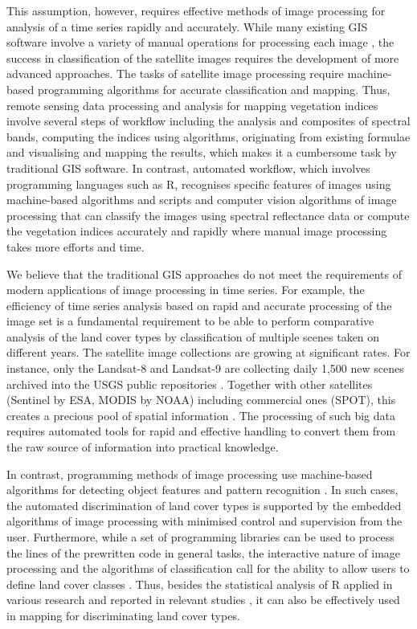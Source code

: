 \documentclass[12pt,a4paper,oneside]{article}
\def \newpar{\vspace{6pt}}
\begin{document}
\newpar This assumption, however, requires effective methods of image processing for analysis of a time series rapidly and accurately. While many existing GIS software involve a variety of manual operations for processing each image \citep{TAPPAN200738,SPIEKERMANN2015113,EPUH2022100067}, the success in classification of the satellite images requires the development of more advanced approaches. The tasks of satellite image processing require machine-based programming algorithms for accurate classification and mapping. Thus, remote sensing data processing and analysis for mapping vegetation indices involve several steps of workflow including the analysis and composites of spectral bands, computing the indices using algorithms, originating from existing formulae and visualising and mapping the results, which makes it a cumbersome task by traditional GIS software. In contrast, automated workflow, which involves programming languages such as R, recognises specific features of images using machine-based algorithms and scripts and computer vision algorithms of image processing that can classify the images using spectral reflectance data or compute the vegetation indices accurately and rapidly where manual image processing takes more efforts and time. 

\newpar We believe that the traditional GIS approaches do not meet the requirements of modern applications of image processing in time series. For example, the efficiency of time series analysis based on rapid and accurate processing of the image set is a fundamental requirement to be able to perform comparative analysis of the land cover types by classification of multiple scenes taken on different years. The satellite image collections are growing at significant rates. For instance, only the Landsat-8 and Landsat-9 are collecting daily 1,500 new scenes archived into the USGS public repositories \citep{USGS}. Together with other satellites (Sentinel by ESA, MODIS by NOAA) including commercial ones (SPOT), this creates a precious pool of spatial information \citep{MainiAgrawal}. The processing of such big data requires automated tools for rapid and effective handling to convert them from the raw source of information into practical knowledge. 

\newpar In contrast, programming methods of image processing use machine-based algorithms for detecting object features and pattern recognition \citep{9297369,jimaging8120317,8882177,9121731}. In such cases, the automated discrimination of land cover types is supported by the embedded algorithms of image processing with minimised control and supervision from the user. Furthermore, while a set of programming libraries can be used to process the lines of the prewritten code in general tasks, the interactive nature of image processing and the algorithms of classification call for the ability to allow users to define land cover classes \citep{Liuetal2009}. Thus, besides the statistical analysis of R applied in various research and reported in relevant studies \citep{BIVAND20001043,Lemenkova201991,GRUNSKY20021219}, it can also be effectively used in mapping for discriminating land cover types. 
\end{document}
